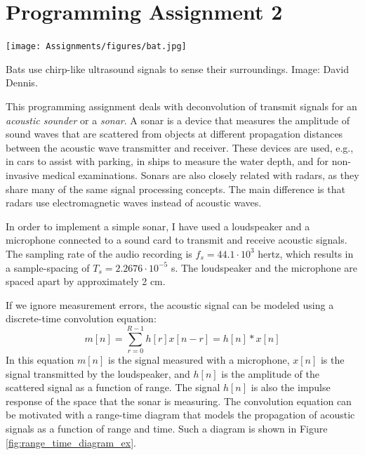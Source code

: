 \chapter{Programming Assignment 2}

\begin{marginfigure}[5cm]
  \begin{center}
    \texttt{[image: Assignments/figures/bat.jpg]}
  \end{center}
  \caption{Bats use chirp-like ultrasound signals to sense their surroundings. Image: David Dennis.}
  \label{fig:bat_image}
\end{marginfigure}

This programming assignment deals with deconvolution of transmit
signals for an \emph{acoustic sounder} or a \emph{sonar}. A sonar is
a device that measures the amplitude of sound waves that are scattered
from objects at different propagation distances between the acoustic
wave transmitter and receiver. These devices are used, e.g., in cars to
assist with parking, in ships to measure the water depth, and for
non-invasive medical examinations. Sonars are also closely related
with radars, as they share many of the same signal processing
concepts. The main difference is that radars use electromagnetic waves
instead of acoustic waves.

In order to implement a simple sonar, I have used a loudspeaker and a
microphone connected to a sound card to transmit and receive acoustic
signals. The sampling rate of the audio recording is $f_s=44.1\cdot
10^3$ hertz, which results in a sample-spacing of $T_s=2.2676\cdot
10^{-5}$ s. The loudspeaker and the microphone are spaced apart by
approximately 2 cm.
 
If we ignore measurement errors, the acoustic signal can be modeled using
a discrete-time convolution equation:
\begin{equation}
  m[n] = \sum_{r=0}^{R-1} h[r]x[n-r] = h[n] * x[n]
  \label{eq:sonar_eq_pa}
\end{equation}
In this equation $m[n]$ is the signal measured with a microphone,
$x[n]$ is the signal transmitted by the loudspeaker, and $h[n]$ is
the amplitude of the scattered signal as a function of range. The
signal $h[n]$ is also the impulse response of the space that the sonar
is measuring. The convolution equation can be motivated with a
range-time diagram that models the propagation of acoustic signals as
a function of range and time. Such a diagram is shown in Figure
\ref{fig:range_time_diagram_ex}.

